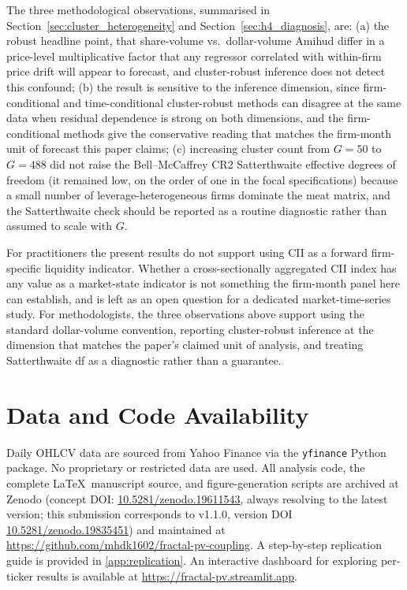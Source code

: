 \documentclass[preprint,12pt,authoryear]{elsarticle}
\begin{document}
The three methodological observations, summarised in Section~\ref{sec:cluster_heterogeneity} and Section~\ref{sec:h4_diagnosis}, are: (a) the robust headline point, that share-volume vs.\ dollar-volume Amihud differ in a price-level multiplicative factor that any regressor correlated with within-firm price drift will appear to forecast, and cluster-robust inference does not detect this confound; (b) the result is sensitive to the inference dimension, since firm-conditional and time-conditional cluster-robust methods can disagree at the same data when residual dependence is strong on both dimensions, and the firm-conditional methods give the conservative reading that matches the firm-month unit of forecast this paper claims; (c) increasing cluster count from $G = 50$ to $G = 488$ did not raise the Bell--McCaffrey CR2 Satterthwaite effective degrees of freedom (it remained low, on the order of one in the focal specifications) because a small number of leverage-heterogeneous firms dominate the meat matrix, and the Satterthwaite check should be reported as a routine diagnostic rather than assumed to scale with $G$.

For practitioners the present results do not support using CII as a forward firm-specific liquidity indicator. Whether a cross-sectionally aggregated CII index has any value as a market-state indicator is not something the firm-month panel here can establish, and is left as an open question for a dedicated market-time-series study. For methodologists, the three observations above support using the standard \citet{amihud2002illiquidity} dollar-volume convention, reporting cluster-robust inference at the dimension that matches the paper's claimed unit of analysis, and treating Satterthwaite df as a diagnostic rather than a guarantee.

\section*{Data and Code Availability}

Daily OHLCV data are sourced from Yahoo Finance via the \texttt{yfinance} Python package. No proprietary or restricted data are used. All analysis code, the complete \LaTeX\ manuscript source, and figure-generation scripts are archived at Zenodo (concept DOI: \href{https://doi.org/10.5281/zenodo.19611543}{10.5281/zenodo.19611543}, always resolving to the latest version; this submission corresponds to v1.1.0, version DOI \href{https://doi.org/10.5281/zenodo.19835451}{10.5281/zenodo.19835451}) and maintained at \url{https://github.com/mhdk1602/fractal-pv-coupling}. A step-by-step replication guide is provided in \ref{app:replication}. An interactive dashboard for exploring per-ticker results is available at \url{https://fractal-pv.streamlit.app}.
\end{document}
